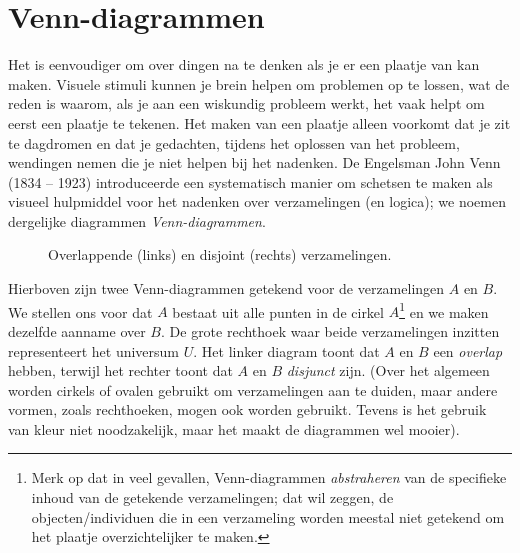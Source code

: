 \section{Venn-diagrammen}\label{sec:venn}
Het is eenvoudiger om over dingen na te denken als je er een plaatje van kan maken. Visuele stimuli kunnen je brein helpen om problemen op te lossen, wat de reden is waarom, als je aan een wiskundig probleem werkt, het vaak helpt om eerst een plaatje te tekenen. Het maken van een plaatje alleen voorkomt dat je zit te dagdromen en dat je gedachten, tijdens het oplossen van het probleem, wendingen nemen die je niet helpen bij het nadenken. De Engelsman John Venn (1834 -- 1923) introduceerde een systematisch manier om schetsen te maken als visueel hulpmiddel voor het nadenken over verzamelingen (en logica); we noemen dergelijke diagrammen \textit{Venn-diagrammen}.

\begin{figure}[ht]
    \centering
    \hspace{1cm} 
    \caption{Overlappende (links) en disjoint (rechts) verzamelingen.}
    \label{fig:disjunct}
\end{figure}

Hierboven zijn twee Venn-diagrammen getekend voor de verzamelingen $A$ en $B$. We stellen ons voor dat $A$ bestaat uit alle punten in de cirkel $A$\footnote{Merk op dat in veel gevallen, Venn-diagrammen \textit{abstraheren} van de specifieke inhoud van de getekende verzamelingen; dat wil zeggen, de objecten/individuen die in een verzameling worden meestal niet getekend om het plaatje overzichtelijker te maken.} en we maken dezelfde aanname over $B$. De grote rechthoek waar beide verzamelingen inzitten representeert het universum $U$. Het linker diagram toont dat $A$ en $B$ een \textit{overlap} hebben, terwijl het rechter toont dat $A$ en $B$ \textit{disjunct} zijn. (Over het algemeen worden cirkels of ovalen gebruikt om verzamelingen aan te duiden, maar andere vormen, zoals rechthoeken, mogen ook worden gebruikt. Tevens is het gebruik van kleur niet noodzakelijk, maar het maakt de diagrammen wel mooier).

